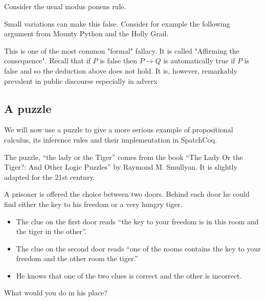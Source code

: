 Consider the usual modus ponens rule. 

Small variations can make this false.
 Consider for example the following argument from Mounty Python and the Holly Grail.
 
 
 
 
 
 
 This is one of the most common "formal" fallacy. It is called "Affirming the consequence". Recall that if $P$ is false then $P\rightarrow Q$ is automatically true if $P$ is false and so the deduction above does not hold. It is, however, remarkably prevalent in public discourse especially in adverx

\subsection{A puzzle}

We will now use a puzzle to give a more serious example	 of propositional calculus, its inference rules and their implementation in SpatchCoq. 

The puzzle, ``the lady or the Tiger'' comes from the book  ``The Lady Or the Tiger?: And Other Logic Puzzles'' by Raymond M. Smullyan. It is slightly adapted for the 21st century.

A  prisoner is offered the choice between two doors. Behind each door he could find either the key to his freedom or a very hungry tiger.

 \begin{itemize}

 \item The clue on the first door reads ``the key to your freedom  is in this room and the tiger in the other''.
 \item The clue on the second door reads ``one of the rooms contains  the key to your freedom and the other room the tiger.''
  \item He knows that one of the two clues is correct and the other is incorrect.
 \end{itemize}

What would you do in his place?

